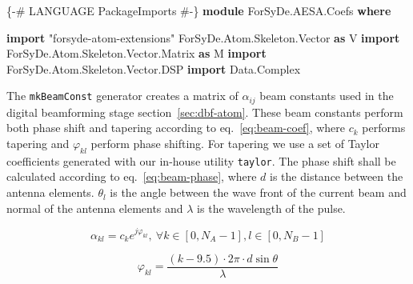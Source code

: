 \documentclass[
  a4paper,
]{article}
\newenvironment{Shaded}{}{}
\newcommand{\DataTypeTok}[1]{\textcolor[rgb]{0.56,0.13,0.00}{#1}}
\newcommand{\KeywordTok}[1]{\textcolor[rgb]{0.00,0.44,0.13}{\textbf{#1}}}
\newcommand{\NormalTok}[1]{#1}
\newcommand{\OtherTok}[1]{\textcolor[rgb]{0.00,0.44,0.13}{#1}}
\begin{document}
\begin{Shaded}
\begin{Highlighting}[numbers=left,,firstnumber=8,]
\OtherTok{\{-# LANGUAGE PackageImports #-\}}
\KeywordTok{module} \DataTypeTok{ForSyDe.AESA.Coefs} \KeywordTok{where}
\end{Highlighting}
\end{Shaded}

\begin{Shaded}
\begin{Highlighting}[numbers=left,,firstnumber=11,]
\KeywordTok{import}\NormalTok{ "forsyde-atom-extensions" }\DataTypeTok{ForSyDe.Atom.Skeleton.Vector} \KeywordTok{as} \DataTypeTok{V}
\KeywordTok{import} \DataTypeTok{ForSyDe.Atom.Skeleton.Vector.Matrix} \KeywordTok{as} \DataTypeTok{M}
\KeywordTok{import} \DataTypeTok{ForSyDe.Atom.Skeleton.Vector.DSP}
\KeywordTok{import} \DataTypeTok{Data.Complex}
\end{Highlighting}
\end{Shaded}

The \texttt{mkBeamConst} generator creates a matrix of \(\alpha_{ij}\)
beam constants used in the digital beamforming stage
section~\ref{sec:dbf-atom}. These beam constants perform both phase
shift and tapering according to eq.~\ref{eq:beam-coef}, where \(c_k\)
performs tapering and \(\varphi_{kl}\) perform phase shifting. For
tapering we use a set of Taylor coefficients generated with our in-house
utility \texttt{taylor}. The phase shift shall be calculated according
to eq.~\ref{eq:beam-phase}, where \(d\) is the distance between the
antenna elements. \(\theta_l\) is the angle between the wave front of
the current beam and normal of the antenna elements and \(\lambda\) is
the wavelength of the pulse.

\begin{equation} \alpha_{kl}=c_k e^{j\varphi_{kl}},\ \forall k\in[0,N_A-1], l \in [0,N_B-1]\label{eq:beam-coef}\end{equation}

\begin{equation} \varphi_{kl}=\frac{(k-9.5)\cdot 2\pi\cdot d \sin\theta}{\lambda}\label{eq:beam-phase}\end{equation}
\end{document}
